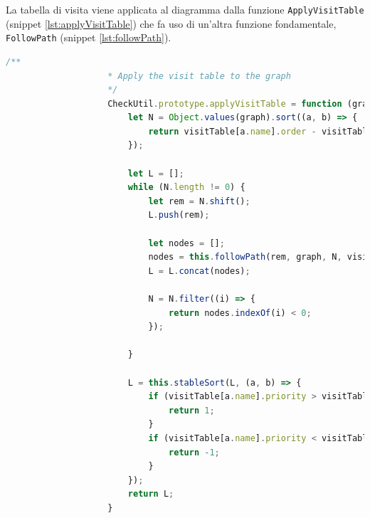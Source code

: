                 La tabella di visita viene applicata al diagramma dalla funzione \texttt{ApplyVisitTable} (snippet \ref{lst:applyVisitTable}) che fa uso di un'altra funzione fondamentale, \texttt{FollowPath} (snippet \ref{lst:followPath}).

                \begin{lstlisting}[language=JavaScript, basicstyle=\tiny, caption={La funzione applyVisitTable}, label={lst:applyVisitTable}]
                    /**
                    * Apply the visit table to the graph
                    */
                    CheckUtil.prototype.applyVisitTable = function (graph, visitTable) {
                        let N = Object.values(graph).sort((a, b) => {
                            return visitTable[a.name].order - visitTable[b.name].order;
                        });

                        let L = [];
                        while (N.length != 0) {
                            let rem = N.shift();
                            L.push(rem);

                            let nodes = [];
                            nodes = this.followPath(rem, graph, N, visitTable, nodes);
                            L = L.concat(nodes);

                            N = N.filter((i) => {
                                return nodes.indexOf(i) < 0;
                            });

                        }

                        L = this.stableSort(L, (a, b) => {
                            if (visitTable[a.name].priority > visitTable[b.name].priority) {
                                return 1;
                            }
                            if (visitTable[a.name].priority < visitTable[b.name].priority) {
                                return -1;
                            }
                        });
                        return L;
                    }
                \end{lstlisting}

